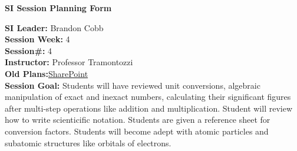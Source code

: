 \documentclass{article}
\begin{document}
\begin{center}
    {\LARGE\textbf{SI Session Planning Form}}
\end{center}

\vspace{0.5cm}

\noindent
\begin{flushleft}
\textbf{SI Leader:} Brandon Cobb\\
\textbf{Session Week:} 4\\
\textbf{Session\#:} 4\\
\textbf{Instructor:} Professor Tramontozzi\\
\textbf{Old Plans:}\href{https://macombedu.sharepoint.com/:b:/s/ASC-SupplementalInstructionEmbeddedTutoring/EeSYqCwT_KhMolgJvXbVEjgBOyF_DevvS8BgCm1zPkQQJg?e=QJTt4o}{SharePoint}\\
\textbf{Session Goal:} Students will have reviewed unit conversions, algebraic manipulation of exact and inexact numbers, calculating their significant figures after multi-step operations like addition and multiplication. Student will review how to write scienticific notation. Students are given a reference sheet for conversion factors. Students will become adept with atomic particles and subatomic structures like orbitals of electrons. 
\end{flushleft}

\vspace{1em}
\end{document}
